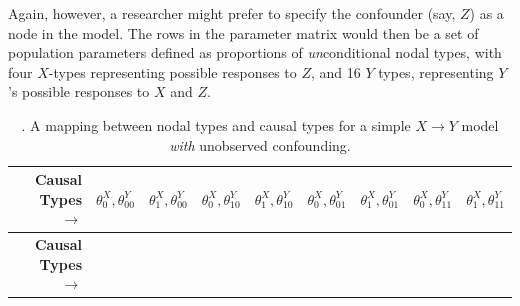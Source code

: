 \documentclass[
  12pt,
]{book}
\begin{document}
Again, however, a researcher might prefer to specify the confounder (say, \(Z\)) as a node in the model. The rows in the parameter matrix would then be a set of population parameters defined as proportions of \emph{un}conditional nodal types, with four \(X\)-types representing possible responses to \(Z\), and 16 \(Y\) types, representing \(Y\)'s possible responses to \(X\) and \(Z\).

\begin{longtable}[]{@{}rcccccccc@{}}
\caption{\label{tab:parammmatrixconf}. A mapping between nodal types and causal types for a simple \(X \rightarrow Y\) model \emph{with} unobserved confounding.}\tabularnewline
\toprule
\begin{minipage}[b]{0.12\columnwidth}\raggedleft
\textbf{Causal Types \(\rightarrow\)}\strut
\end{minipage} & \begin{minipage}[b]{0.08\columnwidth}\centering
\(\theta^X_0,\theta^Y_{00}\)\strut
\end{minipage} & \begin{minipage}[b]{0.08\columnwidth}\centering
\(\theta^X_1,\theta^Y_{00}\)\strut
\end{minipage} & \begin{minipage}[b]{0.08\columnwidth}\centering
\(\theta^X_0,\theta^Y_{10}\)\strut
\end{minipage} & \begin{minipage}[b]{0.08\columnwidth}\centering
\(\theta^X_1,\theta^Y_{10}\)\strut
\end{minipage} & \begin{minipage}[b]{0.08\columnwidth}\centering
\(\theta^X_0,\theta^Y_{01}\)\strut
\end{minipage} & \begin{minipage}[b]{0.08\columnwidth}\centering
\(\theta^X_1,\theta^Y_{01}\)\strut
\end{minipage} & \begin{minipage}[b]{0.08\columnwidth}\centering
\(\theta^X_0,\theta^Y_{11}\)\strut
\end{minipage} & \begin{minipage}[b]{0.08\columnwidth}\centering
\(\theta^X_1,\theta^Y_{11}\)\strut
\end{minipage}\tabularnewline
\midrule
\endfirsthead
\toprule
\begin{minipage}[b]{0.12\columnwidth}\raggedleft
\textbf{Causal Types \(\rightarrow\)}\strut
\end{minipage} & \begin{minipage}[b]{0.08\columnwidth}\centering

\end{minipage}
\end{longtable}
\end{document}
